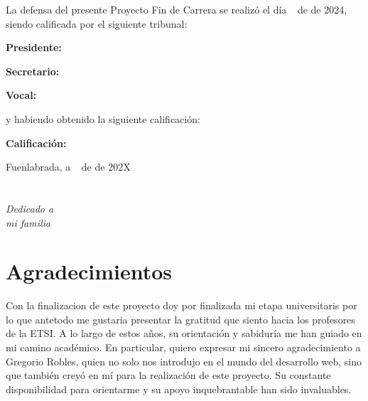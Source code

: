 \documentclass[a4paper, 12pt]{book}
\begin{document}
\vspace{1cm}
La defensa del presente Proyecto Fin de Carrera se realizó el día \qquad$\;\,$ de \qquad\qquad\qquad\qquad \newline de 2024, siendo calificada por el siguiente tribunal:


\vspace{0.5cm}
\textbf{Presidente:}

\vspace{1.2cm}
\textbf{Secretario:}

\vspace{1.2cm}
\textbf{Vocal:}


\vspace{1.2cm}
y habiendo obtenido la siguiente calificación:

\vspace{1cm}
\textbf{Calificación:}


\vspace{1cm}
\begin{flushright}
Fuenlabrada, a \qquad$\;\,$ de \qquad\qquad\qquad\qquad de 202X
\end{flushright}


\chapter*{}
\begin{flushright}
\textit{Dedicado a \\
mi familia}
\end{flushright}


\chapter*{Agradecimientos}

Con la finalizacion de este proyecto doy por finalizada mi etapa universitaris por lo que 
antetodo me gustaria presentar la gratitud que siento hacia los profesores de la ETSI. A 
lo largo de estos años, su orientación y sabiduría me han guiado en mi camino académico. 
En particular, quiero expresar mi sincero agradecimiento a Gregorio Robles, quien no solo nos 
introdujo en el mundo del desarrollo web, sino que también creyó en mí para la realización de 
este proyecto. Su constante disponibilidad para orientarme y su apoyo inquebrantable han sido invaluables.
\end{document}

